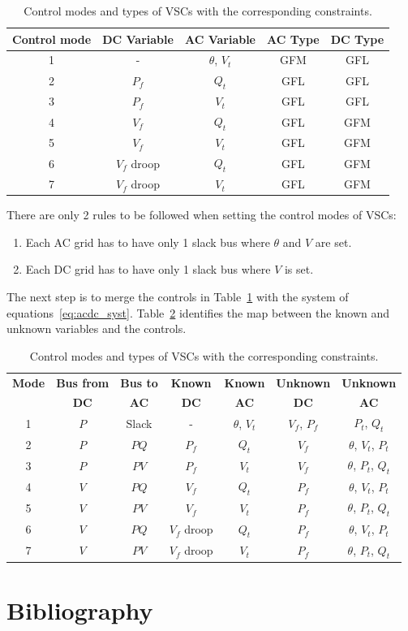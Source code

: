 \documentclass[11pt]{article}
\begin{document}
	\begin{table}[!htb]\centering
		\caption{Control modes and types of VSCs with the corresponding constraints.}
		\begin{tabular}{ccccc}
			\hline
			\textbf{Control mode} & \textbf{DC Variable} & \textbf{AC Variable} & \textbf{AC Type} & \textbf{DC Type} \\
			\hline
			1 & - & $\theta$, $V_t$ & GFM & GFL \\
			2 & $P_f$ & $Q_t$ & GFL & GFL \\
			3 & $P_f$ & $V_t$ & GFL & GFL \\
			4 & $V_f$ & $Q_t$ & GFL & GFM \\
			5 & $V_f$ & $V_t$ & GFL & GFM \\
			6 & $V_f$ droop & $Q_t$ & GFL & GFM \\
			7 & $V_f$ droop & $V_t$ & GFL & GFM \\
			\hline
		\end{tabular}
		\label{table:contr_vsc}
	\end{table}

	There are only 2 rules to be followed when setting the control modes of VSCs:
	\begin{enumerate}
		\item Each AC grid has to have only 1 slack bus where $\theta$ and $V$ are set.
		\item Each DC grid has to have only 1 slack bus where $V$ is set.
	\end{enumerate}
	The next step is to merge the controls in Table~\ref{table:contr_vsc} with the system of equations~\eqref{eq:acdc_syst}. Table~\ref{table:vsc_map} identifies the map between the known and unknown variables and the controls.

	\begin{table}[!htb]\centering
		\caption{Control modes and types of VSCs with the corresponding constraints.}
		\begin{tabular}{ccccccc}
			\hline
			\textbf{Mode} & \textbf{Bus from} & \textbf{Bus to} & \textbf{Known} & \textbf{Known} & \textbf{Unknown} & \textbf{Unknown} \\
			\textbf{} & \textbf{DC} & \textbf{AC} & \textbf{DC} & \textbf{AC} & \textbf{DC} & \textbf{AC} \\
			\hline
			1 & $P$ & Slack & - & $\theta$, $V_t$ & $V_f$, $P_f$ & $P_t$, $Q_t$ \\
			2 & $P$ & $PQ$ & $P_f$ & $Q_t$ & $V_f$ & $\theta$, $V_t$, $P_t$ \\
			3 & $P$ & $PV$ & $P_f$ & $V_t$ & $V_f$ & $\theta$, $P_t$, $Q_t$ \\
			4 & $V$ & $PQ$ & $V_f$ & $Q_t$ & $P_f$ & $\theta$, $V_t$, $P_t$ \\
			5 & $V$ & $PV$ & $V_f$ & $V_t$ & $P_f$ & $\theta$, $P_t$, $Q_t$ \\
			6 & $V$ & $PQ$ & $V_f$ droop & $Q_t$ & $P_f$ & $\theta$, $V_t$, $P_t$ \\
			7 & $V$ & $PV$ & $V_f$ droop & $V_t$ & $P_f$ & $\theta$, $P_t$, $Q_t$ \\
			\hline
		\end{tabular}
		\label{table:vsc_map}
	\end{table}



	
	\section{Bibliography}
	\printbibliography
	
\end{document}
